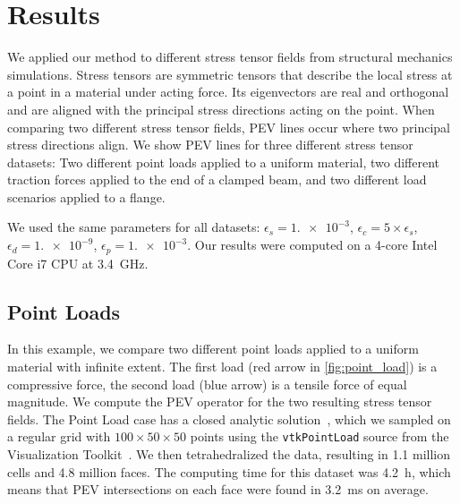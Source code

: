 

\section{Results} %
\label{sec:pev_results}
%
We applied our method to different stress tensor fields from structural
mechanics simulations.
%
Stress tensors are symmetric tensors that describe the local stress at a point
in a material under acting force.
%
Its eigenvectors are real and orthogonal and are aligned with the principal
stress directions acting on the point.
%
When comparing two different stress tensor fields, \ac{PEV} lines occur where two
principal stress directions align.
%
We show \ac{PEV} lines for three different stress tensor datasets:
%
Two different point loads applied to a uniform material, two different traction
forces applied to the end of a clamped beam, and two different load scenarios
applied to a flange.
%

%
We used the same parameters for all datasets:
%
$\epsilon_s = \num{1.e-3}$, $\epsilon_c = 5 \times \epsilon_s$, $\epsilon_d =
\num{1.e-9}$, $\epsilon_p = \num{1.e-3}$.
%
Our results were computed on a 4-core Intel Core i7 \ac{CPU} at
\SI{3.4}{\giga\hertz}.
%
\subsection{Point Loads} %
\label{ssub:point_loads}
%
%
%
%
%
%
In this example, we compare two different point loads applied to a uniform
material with infinite extent.
%
The first load (red arrow in \cref{fig:point_load}) is a compressive force,
the second load (blue arrow) is a tensile force of equal magnitude.
%
We compute the \ac{PEV} operator for the two resulting stress tensor fields.
%
The Point Load case has a closed analytic solution~\cite{Saada2013}, which we
sampled on a regular grid with $\num{100} \times \num{50} \times \num{50}$
points using the \texttt{vtkPointLoad} source from the Visualization
Toolkit~\cite{Schroeder2006}.
%
We then tetrahedralized the data, resulting in \num{1.1} million cells and
\num{4.8} million faces.
%
The computing time for this dataset was \SI{4.2}{\hour}, which means that \ac{PEV}
intersections on each face were found in \SI{3.2}{\milli\second} on average.
%

